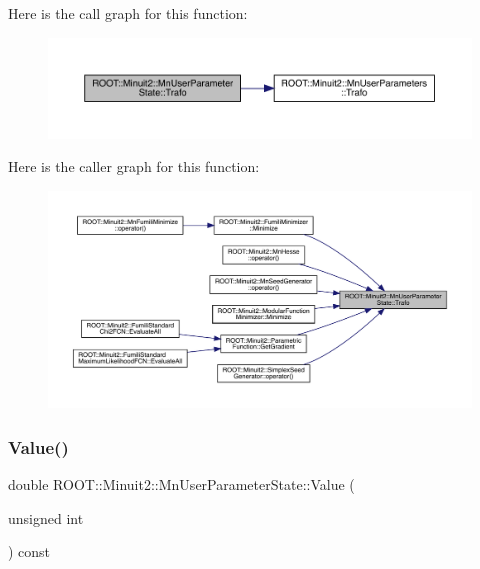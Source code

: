 Here is the call graph for this function\+:
\nopagebreak
\begin{figure}[H]
\begin{center}
\leavevmode
\includegraphics[width=350pt]{d3/de0/classROOT_1_1Minuit2_1_1MnUserParameterState_a7184e94a20e923d68f1fb00ab5c549b2_cgraph}
\end{center}
\end{figure}
Here is the caller graph for this function\+:
\nopagebreak
\begin{figure}[H]
\begin{center}
\leavevmode
\includegraphics[width=350pt]{d3/de0/classROOT_1_1Minuit2_1_1MnUserParameterState_a7184e94a20e923d68f1fb00ab5c549b2_icgraph}
\end{center}
\end{figure}
\mbox{\label{classROOT_1_1Minuit2_1_1MnUserParameterState_a0f977953363899fd9ee8933b879cde3e}} 
\subsubsection{\texorpdfstring{Value()}{Value()}\hspace{0.1cm}{\footnotesize\ttfamily [1/6]}}
{\footnotesize\ttfamily double R\+O\+O\+T\+::\+Minuit2\+::\+Mn\+User\+Parameter\+State\+::\+Value (\begin{DoxyParamCaption}\item[{unsigned int}]{ }\end{DoxyParamCaption}) const}

